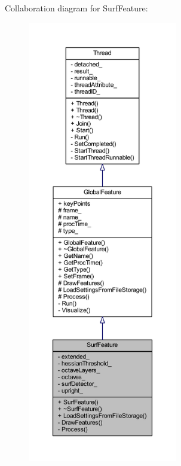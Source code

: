 Collaboration diagram for Surf\-Feature\-:
\nopagebreak
\begin{figure}[H]
\begin{center}
\leavevmode
\includegraphics[height=550pt]{class_surf_feature__coll__graph}
\end{center}
\end{figure}
